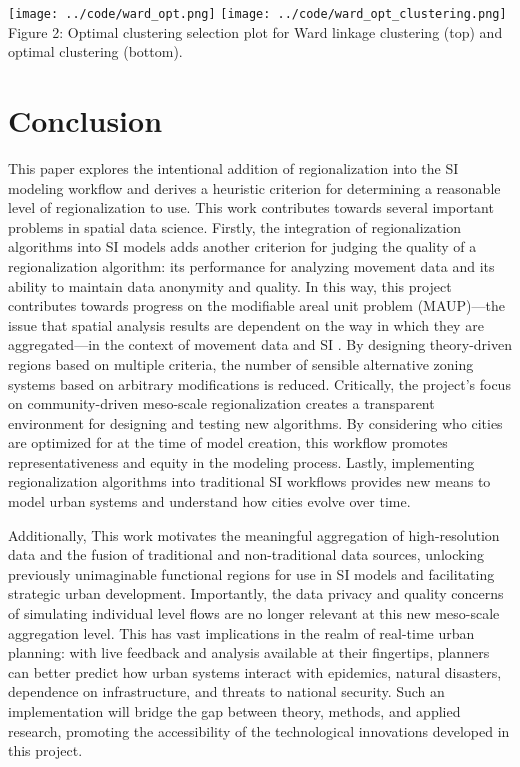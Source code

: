 \documentclass{article}
\begin{document}
    \begin{center}
        \texttt{[image: ../code/ward\_opt.png]} \texttt{[image: ../code/ward\_opt\_clustering.png]} \\
        Figure 2: Optimal clustering selection plot for Ward linkage clustering (top) and optimal clustering (bottom).
    \end{center}

    \section{Conclusion} \label{sec:conclude}
    This paper explores the intentional addition of regionalization into the SI modeling workflow and derives a heuristic criterion for determining a reasonable level of regionalization to use. This work contributes towards several important problems in spatial data science. Firstly, the integration of regionalization algorithms into SI models adds another criterion for judging the quality of a regionalization algorithm: its performance for analyzing movement data and its ability to maintain data anonymity and quality. In this way, this project contributes towards progress on the modifiable areal unit problem (MAUP)---the issue that spatial analysis results are dependent on the way in which they are aggregated---in the context of movement data and SI \cite{Openshaw1976,Openshaw1983}. By designing theory-driven regions based on multiple criteria, the number of sensible alternative zoning systems based on arbitrary modifications is reduced. Critically, the project’s focus on community-driven meso-scale regionalization creates a transparent environment for designing and testing new algorithms. By considering who cities are optimized for at the time of model creation, this workflow promotes representativeness and equity in the modeling process. Lastly, implementing regionalization algorithms into traditional SI workflows provides new means to model urban systems and understand how cities evolve over time.

    Additionally, This work motivates the meaningful aggregation of high-resolution data and the fusion of traditional and non-traditional data sources, unlocking previously unimaginable functional regions for use in SI models and facilitating strategic urban development. Importantly, the data privacy and quality concerns of simulating individual level flows are no longer relevant at this new meso-scale aggregation level. This has vast implications in the realm of real-time urban planning: with live feedback and analysis available at their fingertips, planners can better predict how urban systems interact with epidemics, natural disasters, dependence on infrastructure, and threats to national security. Such an implementation will bridge the gap between theory, methods, and applied research, promoting the accessibility of the technological innovations developed in this project.
\end{document}
